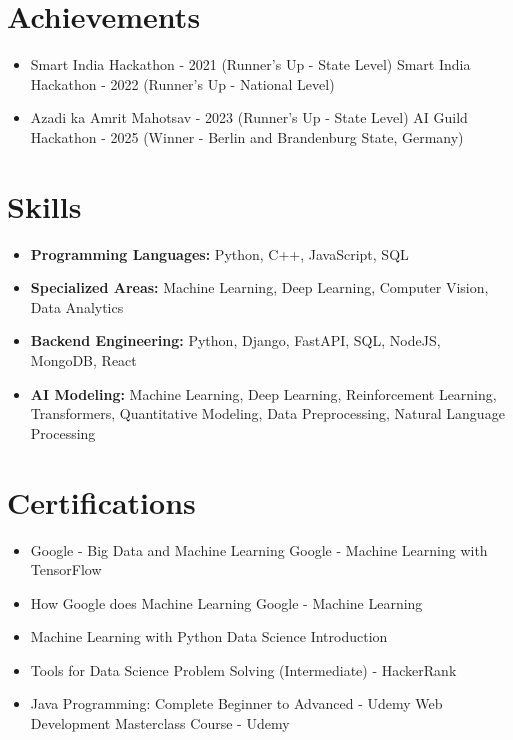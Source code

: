 \documentclass[a4paper,10pt]{article}
\begin{document}
\section*{Achievements}
\begin{itemize}
\item Smart India Hackathon - 2021 (Runner's Up - State Level) \hfill Smart India Hackathon - 2022 (Runner's Up - National Level)
\item Azadi ka Amrit Mahotsav - 2023 (Runner's Up - State Level) \hfill AI Guild Hackathon - 2025 (Winner - Berlin and Brandenburg State, Germany)
\end{itemize}

\section*{Skills}
\begin{itemize}
  \item \textbf{Programming Languages:} Python, C++, JavaScript, SQL
  \item \textbf{Specialized Areas:} Machine Learning, Deep Learning, Computer Vision, Data Analytics
  \item \textbf{Backend Engineering:} Python, Django, FastAPI, SQL, NodeJS, MongoDB, React
  \item \textbf{AI Modeling:} Machine Learning, Deep Learning, Reinforcement Learning, Transformers, Quantitative Modeling, Data Preprocessing, Natural Language Processing
\end{itemize}

\section*{Certifications}
\begin{itemize}
\item Google - Big Data and Machine Learning \hfill Google - Machine Learning with TensorFlow
\item How Google does Machine Learning \hfill Google - Machine Learning
\item Machine Learning with Python \hfill Data Science Introduction
\item Tools for Data Science \hfill Problem Solving (Intermediate) - HackerRank
\item Java Programming: Complete Beginner to Advanced - Udemy \hfill Web Development Masterclass Course - Udemy
\end{itemize}
\end{document}
